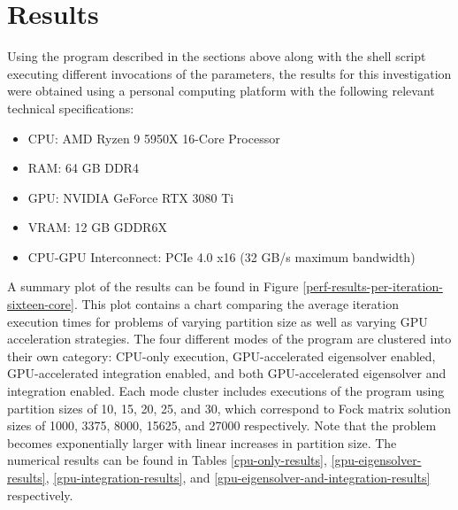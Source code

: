 \documentclass[conference, twoside]{IEEEtran}
\begin{document}
\section{Results}

Using the program described in the sections above along with the shell script executing different invocations of the parameters, the results for this investigation were obtained using a personal computing platform with the following relevant technical specifications:

\begin{itemize}
    \item CPU: AMD Ryzen 9 5950X 16-Core Processor
    \item RAM: 64 GB DDR4
    \item GPU: NVIDIA GeForce RTX 3080 Ti
    \item VRAM: 12 GB GDDR6X 
    \item CPU-GPU Interconnect: PCIe 4.0 x16 (32 GB/s maximum bandwidth)
\end{itemize}

A summary plot of the results can be found in Figure \ref{perf-results-per-iteration-sixteen-core}. This plot contains a chart comparing the average iteration execution times for problems of varying partition size as well as varying GPU acceleration strategies. The four different modes of the program are clustered into their own category: CPU-only execution, GPU-accelerated eigensolver enabled, GPU-accelerated integration enabled, and both GPU-accelerated eigensolver and integration enabled. Each mode cluster includes executions of the program using partition sizes of 10, 15, 20, 25, and 30, which correspond to Fock matrix solution sizes of 1000, 3375, 8000, 15625, and 27000 respectively. Note that the problem becomes exponentially larger with linear increases in partition size. The numerical results can be found in Tables \ref{cpu-only-results}, \ref{gpu-eigensolver-results}, \ref{gpu-integration-results}, and \ref{gpu-eigensolver-and-integration-results} respectively.
\end{document}
